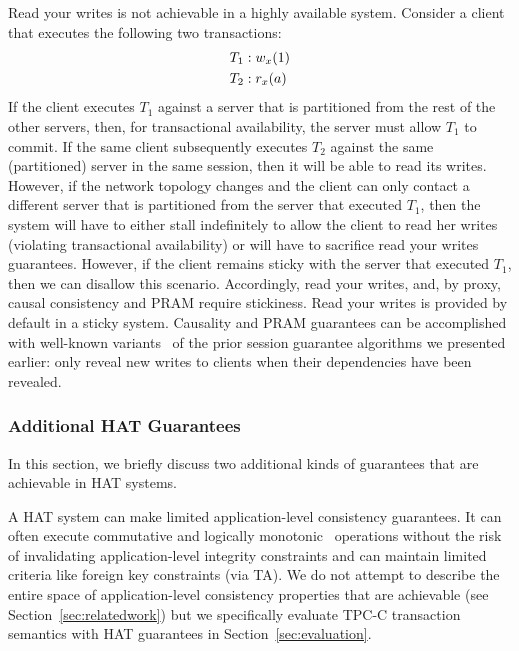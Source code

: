 Read your writes is not achievable in a highly available
system. Consider a client that executes the following two transactions:
\begin{align*}
\small\vspace{-1em}
T_1 &: w_x(1)
\\T_2 &: r_x(a)\vspace{-1em}
\end{align*}
If the client executes $T_1$ against a server that is partitioned from
the rest of the other servers, then, for transactional availability,
the server must allow $T_1$ to commit. If the same client subsequently
executes $T_2$ against the same (partitioned) server in the same
session, then it will be able to read its writes. However, if the
network topology changes and the client can only contact a different
server that is partitioned from the server that executed $T_1$, then
the system will have to either stall indefinitely to allow the client
to read her writes (violating transactional availability) or will have
to sacrifice read your writes guarantees. However, if the client
remains sticky with the server that executed $T_1$, then we can
disallow this scenario. Accordingly, read your writes, and, by proxy,
causal consistency and PRAM require stickiness. Read your writes is
provided by default in a sticky system. Causality and PRAM guarantees
can be accomplished with well-known variants~\cite{causalmemory,
  bolton, cops, sessionguarantees, swift} of the prior session
guarantee algorithms we presented earlier: only reveal new writes to
clients when their dependencies have been revealed.

\subsubsection{Additional HAT Guarantees}

In this section, we briefly discuss two additional kinds of guarantees
that are achievable in HAT systems.

\vspace{0.5em}
 A HAT system can make limited
application-level consistency guarantees. It can often execute
commutative and logically monotonic~\cite{calm} operations without the
risk of invalidating application-level integrity constraints and can
maintain limited criteria like foreign key constraints (via TA). We do
not attempt to describe the entire space of application-level
consistency properties that are achievable (see
Section~\ref{sec:relatedwork}) but we specifically evaluate TPC-C
transaction semantics with HAT guarantees in
Section~\ref{sec:evaluation}.

